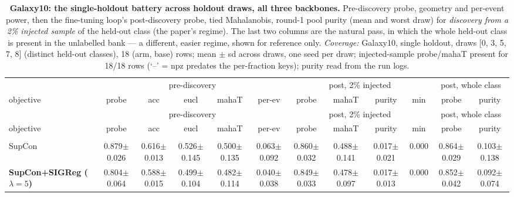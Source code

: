 \begin{landscape}
\begin{center}
\footnotesize
\setlength{\tabcolsep}{3pt}
\begin{longtable}{lccccccccccc}
\caption{\textbf{Galaxy10: the single-holdout battery across holdout draws, all three backbones.} Pre-discovery probe, geometry and per-event power, then the fine-tuning loop's post-discovery probe, tied Mahalanobis, round-1 pool purity (mean and worst draw) for \emph{discovery from a 2\% injected sample} of the held-out class (the paper's regime). The last two columns are the natural pass, in which the whole held-out class is present in the unlabelled bank --- a different, easier regime, shown for reference only. \emph{Coverage:} Galaxy10, single holdout, draws [0, 3, 5, 7, 8] (distinct held-out classes), 18 (arm, base) rows; mean $\pm$ sd across draws, one seed per draw; injected-sample probe/mahaT present for 18/18 rows (`--' = npz predates the per-fraction keys); purity read from the run logs.}\label{tab:app_galaxy10_draws}\\
\toprule
& \multicolumn{5}{c}{pre-discovery} & \multicolumn{4}{c}{post, 2\% injected} & \multicolumn{2}{c}{post, whole class} \\
\cmidrule(lr){2-6}\cmidrule(lr){7-10}\cmidrule(lr){11-12}
objective & probe & acc & eucl & mahaT & per-ev & probe & mahaT & purity & min & probe & purity \\
\midrule
\endfirsthead
\toprule
& \multicolumn{5}{c}{pre-discovery} & \multicolumn{4}{c}{post, 2\% injected} & \multicolumn{2}{c}{post, whole class} \\
\cmidrule(lr){2-6}\cmidrule(lr){7-10}\cmidrule(lr){11-12}
objective & probe & acc & eucl & mahaT & per-ev & probe & mahaT & purity & min & probe & purity \\
\midrule
\endhead
\bottomrule
\endfoot
\multicolumn{12}{l}{\emph{Galaxy10 / DINO, 5 draws}} \\
\quad SupCon & 0.879$\pm$0.026 & 0.616$\pm$0.013 & 0.526$\pm$0.145 & 0.500$\pm$0.135 & 0.063$\pm$0.092 & 0.860$\pm$0.032 & 0.488$\pm$0.141 & 0.017$\pm$0.021 & 0.000 & 0.864$\pm$0.029 & 0.103$\pm$0.138 \\
\quad \textbf{SupCon+SIGReg ($\lambda{=}5$)} & 0.804$\pm$0.064 & 0.588$\pm$0.015 & 0.499$\pm$0.104 & 0.482$\pm$0.114 & 0.040$\pm$0.038 & 0.849$\pm$0.033 & 0.478$\pm$0.097 & 0.017$\pm$0.013 & 0.000 & 0.852$\pm$0.042 & 0.092$\pm$0.074 \\

\end{longtable}
\end{center}
\end{landscape}
